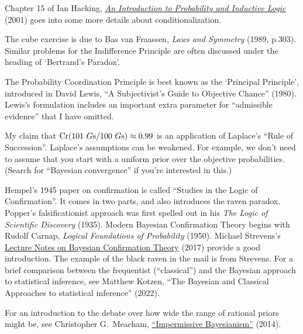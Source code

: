 \begin{sources}

  Chapter 15 of Ian Hacking,
  \href{http://fitelson.org/confirmation/hacking_introduction_to_probability_and_inductive_logic.pdf}{\emph{An Introduction to Probability and Inductive Logic}}
  (2001) goes into some more details about conditionalization.

  The cube exercise is due to Bas van Fraassen, \emph{Laws and Symmetry} (1989,
  p.303). Similar problems for the Indifference Principle are often discussed
  under the heading of `Bertrand's Paradox'. 


  The Probability Coordination Principle is best known as the `Principal
  Principle', introduced in David Lewis, ``A Subjectivist's Guide to Objective
  Chance'' (1980). Lewis's formulation includes an important extra parameter for
  ``admissible evidence'' that I have omitted. 

  My claim that $\text{Cr}(\text{101 }G\text{s} / \text{100 }G\text{s}) \approx 0.99$
  is an application of Laplace's ``Rule of Succession''. Laplace's assumptions
  can be weakened. For example, we don't need to assume that you start with a
  uniform prior over the objective probabilities. (Search for ``Bayesian
  convergence'' if you're interested in this.)
  
  Hempel's 1945 paper on confirmation is called ``Studies in the Logic of
  Confirmation''. It comes in two parts, and also introduces the raven paradox.
  Popper's falsificationist approach was first spelled out in his \emph{The
    Logic of Scientific Discovery} (1935). Modern Bayesian Confirmation Theory begins with
  Rudolf Carnap, \emph{Logical Foundations of Probability} (1950). Michael
  Strevens's
  \href{http://www.strevens.org/bct/BCT.pdf}{Lecture Notes on Bayesian Confirmation Theory}
  (2017) provide a good introduction. The example of the black raven in the mail
  is from Strevens. For a brief comparison between the frequentist
  (``classical'') and the Bayesian approach to statistical inference, see
  Matthew Kotzen, ``The Bayesian and Classical Approaches to statistical
  inference'' (2022).

  For an introduction to the debate over how wide the range of rational
  priors might be, see Christopher G.\ Meacham,
  \href{http://people.umass.edu/cmeacham/Meacham.Impermissive.Bayesiansim.pdf}{``Impermissive Bayesianism''}
  (2014).



  
\end{sources}


